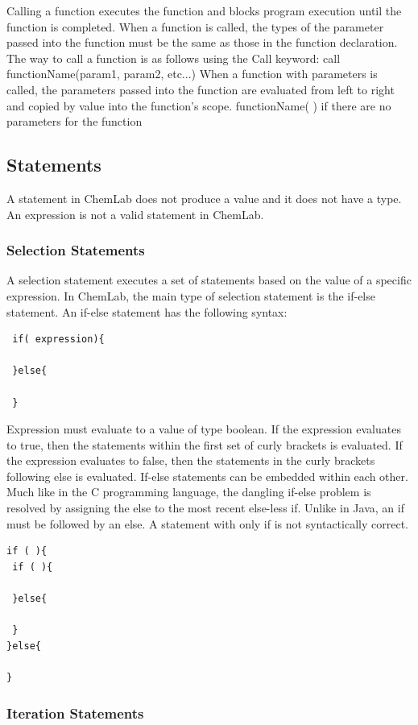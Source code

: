 \documentclass[11pt]{report}
\begin{document}
Calling a function executes the function and blocks program execution until the function is completed. When a function is called, the types of the parameter passed into the function must be the same as those in the function declaration. The way to call a function is as follows using the Call keyword: 
call functionName(param1, param2, etc...) 
When a function with parameters is called, the parameters passed into the function are evaluated from left to right and copied by value into the function's scope.
functionName( ) if there are no parameters for the function

\subsection{Statements}

A statement in ChemLab does not produce a value and it does not have a type. An expression is not a valid statement in ChemLab. 

\subsubsection{Selection Statements}

A selection statement executes a set of statements based on the value of a specific expression. In ChemLab, the main type of selection statement is the if-else statement. An if-else statement has the following syntax:
\begin{verbatim}
 if( expression){

 }else{

 }
\end{verbatim}
Expression must evaluate to a value of type boolean. If the expression evaluates to true, then the statements within the first set of curly brackets is evaluated. If the expression evaluates to false, then the statements in the curly brackets following else is evaluated. If-else statements can be embedded within each other. Much like in the C programming language, the dangling if-else problem is resolved by assigning the else to the most recent else-less if. Unlike in Java, an if must be followed by an else. A statement with only if is not syntactically correct. 
\begin{verbatim}
if ( ){
 if ( ){

 }else{
 
 }
}else{

}
\end{verbatim}
\subsubsection{Iteration Statements}
\end{document}
